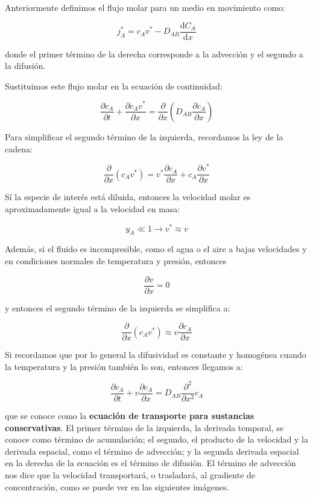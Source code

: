 \documentclass[11pt]{article}
\begin{document}
Anteriormente definimos el flujo molar para un medio en movimiento como:

\[ j_A^* = c_A v^* - D_{AB} \frac{ \mathrm d C_A }{ \mathrm d x } \]

donde el primer término de la derecha corresponde a la advección y el segundo a la difusión.

Sustituimos este flujo molar en la ecuación de continuidad:

\[ \frac{ \partial c_A }{ \partial t } + \frac{ \partial c_A v^* }{ \partial x } = \frac{ \partial }{ \partial x } \left( D_{AB} \frac{ \partial c_A }{ \partial x } \right) \]

Para simplificar el segundo término de la izquierda, recordamos la ley de la cadena:

\[ \frac{ \partial }{ \partial x } \left( c_A v^* \right) = v^* \frac{ \partial c_A }{ \partial x } + c_A \frac{ \partial v^* }{ \partial x } \]

Sí la especie de interés está diluida, entonces la velocidad molar es aproximadamente igual a la velocidad en masa:

\[ y_A \ll 1 \longrightarrow v^* \approx v \]

Además, si el fluido es incompresible, como el agua o el aire a bajas velocidades y en condiciones normales de temperatura y presión, entonces

\[ \frac{ \partial v }{ \partial x } = 0 \]

y entonces el segundo término de la izquierda se simplifica a:

\[ \frac{ \partial }{ \partial x } \left( c_A v^* \right) \approx v \frac{ \partial c_A }{ \partial x } \]

Si recordamos que por lo general la difusividad es constante y homogénea cuando la temperatura y la presión también lo son, entonces llegamos a:

\[ \boxed{ \frac{ \partial c_A }{ \partial t } + v \frac{ \partial c_A }{ \partial x } = D_{AB} \frac{ \partial ^2 }{ \partial x^2 } c_A } \]

que se conoce como la \textbf{ecuación de transporte para sustancias conservativas}. El primer término de la izquierda, la derivada temporal, se conoce como término de acumulación; el segundo, el producto de la velocidad y la derivada espacial, como el término de advección; y la segunda derivada espacial en la derecha de la ecuación es el término de difusión. El término de advección nos dice que la velocidad transportará, o trasladará, al gradiente de concentración, como se puede ver en las siguientes imágenes.
\end{document}
